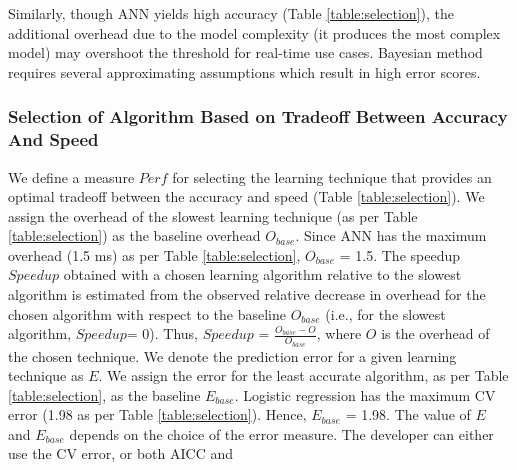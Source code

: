 \documentclass[conference]{IEEEtran}
\begin{document}
   Similarly, though ANN yields high accuracy (Table \ref{table:selection}), the additional overhead due to the model complexity (it produces the most complex model) may overshoot the threshold for real-time use cases. Bayesian method requires several approximating assumptions which result in high error scores.   \subsubsection{Selection of Algorithm Based on Tradeoff Between Accuracy And Speed}\label{sec:criteria}

 \begin{table}[!htb]
\caption{Evaluation of the Accuracy-Speed Tradeoff} \label{table:choice}
\end{table}
  We define a measure \emph{$\mathit{Perf}$} for selecting the learning technique that provides an optimal tradeoff between the accuracy and speed (Table \ref{table:selection}).
   We assign the overhead of the slowest learning technique (as per Table \ref{table:selection}) as the baseline overhead $O_{\mathit{base}}$. Since ANN has the maximum overhead (1.5 ms) as per Table \ref{table:selection},
  $O_{\mathit{base}}$ = 1.5.
 The speedup $\mathit{Speedup}$ obtained with a chosen learning algorithm relative to the slowest
  algorithm is estimated from the observed relative decrease in overhead for the chosen algorithm with respect to the baseline $O_{\mathit{base}}$ (i.e., for the slowest algorithm, $\mathit{Speedup}$= 0).
   Thus,
  $\mathit{Speedup}$  = $\frac{O_{\mathit{base}} - O}{O_{\mathit{base}}}$, where $O$ is the overhead of the chosen
  technique.
     We denote the prediction error for a given learning technique as $E$. We assign
   the error for the least accurate algorithm, as per Table \ref{table:selection}, as the baseline
   $E_{\mathit{base}}$. Logistic regression has the maximum CV error (1.98 as per Table \ref{table:selection}).
    Hence, $E_{\mathit{base}}$ = 1.98. The value of $E$ and $E_{\mathit{base}}$ depends on the choice of
   the error measure.  The developer can either use the CV error, or both AICC and
\end{document}
